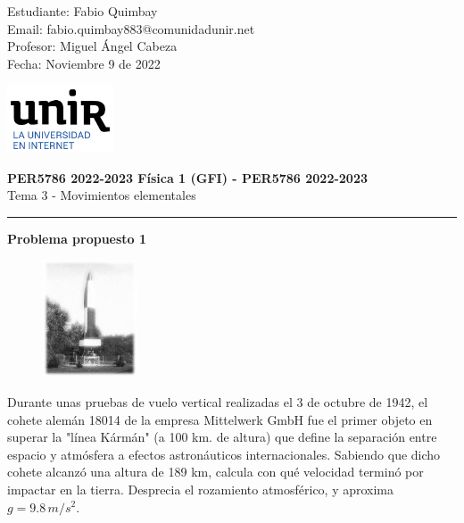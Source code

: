 \documentclass[11pt,letterpaper]{article}
\begin{document}
\pagestyle{plain}

\begin{flushleft}
Estudiante: Fabio Quimbay\\
Email: fabio.quimbay883@comunidadunir.net\\
Profesor: Miguel Ángel Cabeza\\
Fecha: Noviembre 9 de 2022\\
\end{flushleft}

\begin{flushright}\vspace{-20mm}
\includegraphics[height=2cm]{logo.png}
\end{flushright}
 
\begin{center}\vspace{0cm}
\textbf{\large PER5786 2022-2023  Física 1 (GFI) - PER5786 2022-2023}\\
 Tema 3 - Movimientos elementales
\end{center}

 
\rule{\linewidth}{0.1mm}

\bigskip
\bigskip

\textbf{Problema propuesto 1}\\

\begin{figure}
\begin{center}
\includegraphics[width=0.25\textwidth]{problema_1.png}
\end{center}
\end{figure}

Durante unas pruebas de vuelo vertical realizadas el 3 de octubre de 1942, el cohete alemán 18014 de la empresa Mittelwerk GmbH fue el primer objeto en superar la "línea Kármán" (a 100 km. de altura) que define la separación entre espacio y atmósfera a efectos astronáuticos internacionales. Sabiendo que dicho cohete alcanzó una altura de 189 km, calcula con qué velocidad terminó por impactar en la tierra. Desprecia el rozamiento atmosférico, y aproxima $g=9.8\,m/s^2$.\\
\end{document}

